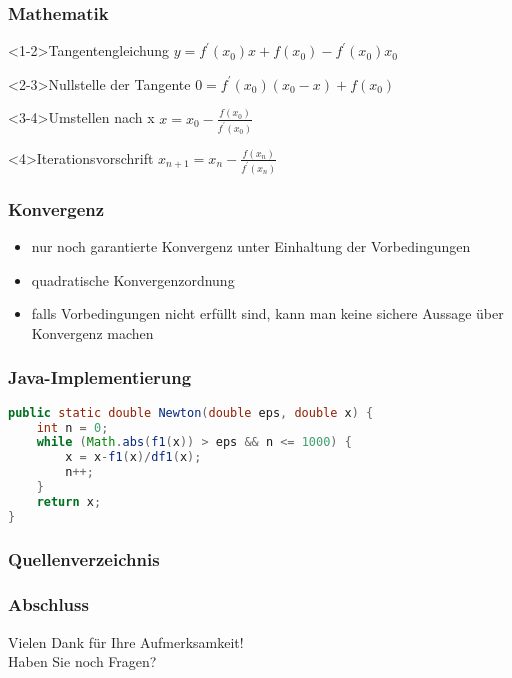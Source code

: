 \documentclass[table]{beamer}
\begin{document}
\begin{frame}
\frametitle{Mathematik}
\begin{block}<1-2>{Tangentengleichung}
$y=f^{'}(x_0) x+f(x_0)-f^{'}(x_0) x_0$
\end{block}
\begin{block}<2-3>{Nullstelle der Tangente}
$0=f^{'}(x_0) (x_0-x)+f(x_0)$
\end{block}
\begin{block}<3-4>{Umstellen nach x}
$x=x_0-\frac{f(x_0)}{f^{'}(x_0)}$
\end{block}
\begin{block}<4>{Iterationsvorschrift}
$x_{n+1}=x_n-\frac{f(x_n)}{f^{'}(x_n)}$
\end{block}
\end{frame}
\begin{frame}
\frametitle{Konvergenz}
\begin{itemize}
\item nur noch garantierte Konvergenz unter Einhaltung der Vorbedingungen
\item quadratische Konvergenzordnung
\item falls Vorbedingungen nicht erfüllt sind, kann man keine sichere Aussage über Konvergenz machen
\end{itemize}
\end{frame}
\begin{frame}[fragile]
\frametitle{Java-Implementierung}
\begin{lstlisting}[language=Java,basicstyle=\ttfamily,keywordstyle=\color{blue}]
public static double Newton(double eps, double x) {
	int n = 0;
	while (Math.abs(f1(x)) > eps && n <= 1000) {
		x = x-f1(x)/df1(x);
		n++;
	}
	return x;
}
\end{lstlisting}
\end{frame}
\begin{frame}[allowframebreaks]
\frametitle{Quellenverzeichnis}
	
	
\end{frame}
\begin{frame}
\frametitle{Abschluss}
	\begin{block}{}
		\begin{center}
			\huge{Vielen Dank für Ihre Aufmerksamkeit!\\Haben Sie noch Fragen?}
		\end{center}
	\end{block}
\end{frame}
\end{document}
